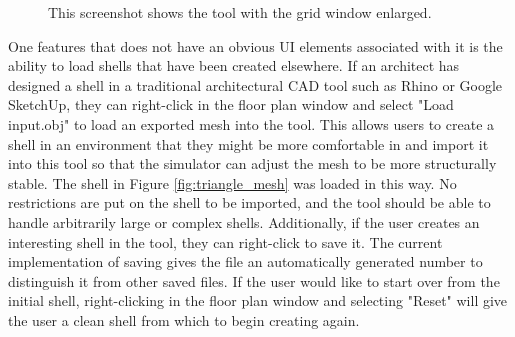 \documentclass{thesis}
\begin{document}
\begin{figure}
\caption[Zoomed in grid]{This screenshot shows the tool with the grid window enlarged.}
\label{fig:big_grid}
\end{figure}

One features that does not have an obvious UI elements associated with it is the ability to load shells that have been created
elsewhere.  If an architect has designed a shell in a traditional architectural CAD tool such as Rhino or Google SketchUp, they
can right-click in the floor plan window and select "Load input.obj" to load an exported mesh into the tool.  This allows users
to create a shell in an environment that they might be more comfortable in and import it into this tool so that the simulator
can adjust the mesh to be more structurally stable.  The shell in Figure \ref{fig:triangle_mesh} was loaded in this way.  No
restrictions are put on the shell to be imported, and the tool should be able to handle arbitrarily large or complex shells.
Additionally, if the user creates an interesting shell in the tool, they can right-click to save it.  The current implementation
of saving gives the file an automatically generated number to distinguish it from other saved files.  If the user would like to
start over from the initial shell, right-clicking in the floor plan window and selecting "Reset" will give the user a clean shell
from which to begin creating again.
\end{document}
